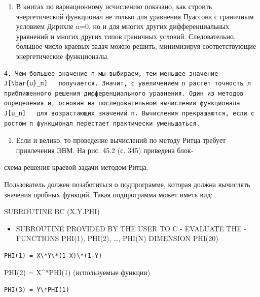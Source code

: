 \documentclass[
  ukrainian,
]{article}
\providecommand{\tightlist}{%
  \setlength{\itemsep}{0pt}\setlength{\parskip}{0pt}}
\begin{document}
\begin{enumerate}
\def\labelenumi{\arabic{enumi}.}
\setcounter{enumi}{2}
\tightlist
\item
  В книгах по вариационному исчислению показано, как строить
  энергетический функционал не только для уравнения Пуассона с граничным
  условием Дирихле u=0, но и для многих других дифференциальных
  уравнений и многих других типов граничных условий. Следовательно,
  большое число краевых задач можно решить, минимизируя соответствующие
  энергетические функционалы.
\end{enumerate}

\begin{verbatim}
4. Чем большее значение п мы выбираем, тем меньшее значение   J[\bar{u}_n]   получается. Значит, с увеличением n растет точность л приближенного решения дифференциального уравнения. Один из методов определения и, основан на последовательном вычислении функционала   J[u_n]   для возрастающих значений n. Вычисления прекращаются, если с ростом п функционал перестает практически уменьшаться.
\end{verbatim}

\begin{enumerate}
\def\labelenumi{\arabic{enumi}.}
\setcounter{enumi}{4}
\tightlist
\item
  Если и велико, то проведение вычислений по методу Ритца требует
  привлечения ЭВМ. На рис. 45.2 (с. 345) приведена блок-
\end{enumerate}

схема решения краевой задачи методом Ритца.

Пользователь должен позаботиться о подпрограмме, которая должна
вычислять значения пробных функций. Такая подпрограмма может иметь вид:

SUBROUTINE BC (X.Y.PHI)

\begin{itemize}
\tightlist
\item
  SUBROUTINE PROVIDED BY THE USER TO C - EVALUATE THE - FUNCTIONS
  PHI(1), PHI(2), \ldots, PHI(N) DIMENSION PHI(20)
\end{itemize}

\begin{verbatim}
PHI(1) = X\*Y\*(1-X)\*(1-Y)
\end{verbatim}

PHI(2) = X\^{}*PHI(1) (используемые функции)

\begin{verbatim}
PHI(3) = Y\*PHI(1)
\end{verbatim}
\end{document}
